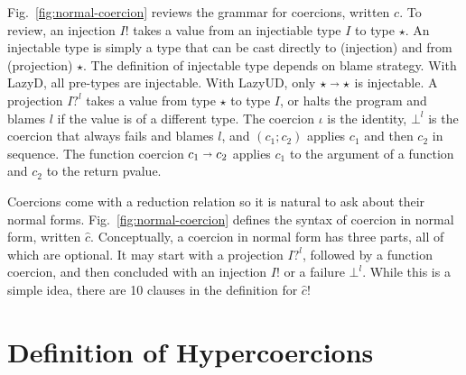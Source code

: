 \documentclass[acmsmall,review,anonymous]{acmart}\settopmatter{printfolios=true,printccs=false,printacmref=false}
\newcommand{\figref}[1]{Fig.~\ref{#1}}
\newcommand{\lazyUD}{Lazy\;UD}
\newcommand{\lazyD}{Lazy\;D}
\newcommand{\TOOdyn}[0]{\star}
\newcommand{\POOfun}[2]{#1 \shortrightarrow #2}
\newcommand{\vOOcast}[2]{#1\langle#2\rangle}
\newcommand{\ncSeq}[2]{#1;#2}
\newcommand{\ncFun}[2]{\POOfun{#1}{#2}}
\begin{document}
\figref{fig:normal-coercion} reviews the grammar for coercions,
written $c$.
%
To review, an injection $I!$ takes a value from an injectiable type
$I$ to type $\TOOdyn$. An injectable type is simply a type that can be
cast directly to (injection) and from (projection) $\TOOdyn$. The
definition of injectable type depends on blame strategy. With \lazyD,
all pre-types are injectable. With \lazyUD, only
$\POOfun{\TOOdyn}{\TOOdyn}$ is injectable.
%
A projection $I?^l$ takes a value from type $\TOOdyn$ to type $I$, or
halts the program and blames $l$ if the value is of a different type.
The coercion $\iota$ is the identity, $\bot^{l}$ is the coercion that
always fails and blames $l$, and $(\ncSeq{c_1}{c_2})$ applies $c_1$ and
then $c_2$ in sequence. The function coercion $\ncFun{c_1}{c_2}$
applies $c_1$ to the argument of a function and $c_2$ to the return
pvalue.

Coercions come with a reduction relation so it is natural to ask about
their normal forms. \figref{fig:normal-coercion} defines the syntax of
coercion in normal form, written $\hat{c}$. Conceptually, a coercion
in normal form has three parts, all of which are optional.  It may
start with a projection $I?^l$, followed by a function coercion, and
then concluded with an injection $I!$ or a failure $\bot^l$. While
this is a simple idea, there are 10 clauses in the definition for
$\hat{c}$!




\section{Definition of Hypercoercions} \label{sec:hypercoercion-definition}
\end{document}
